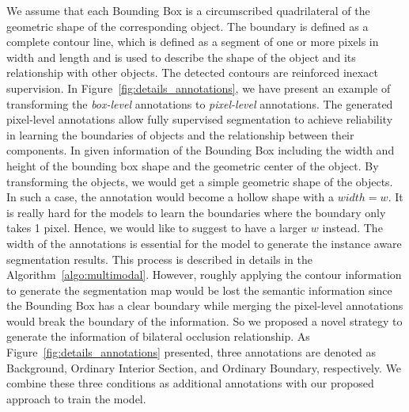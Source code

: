 \documentclass{article}
\begin{document}
{We assume that each Bounding Box is a circumscribed quadrilateral of the geometric shape of the corresponding object.
The boundary is defined as a complete contour line, which is defined as a segment of one or more pixels in width and length and is used to describe the shape of the object and its relationship with other objects. The detected contours are reinforced inexact supervision. In Figure~\ref{fig:details_annotations}, we have present an example of transforming the \textit{box-level} annotations to \textit{pixel-level} annotations.
The generated pixel-level annotations allow fully supervised segmentation to achieve reliability in learning the boundaries of objects and the relationship between their components. In given information of the Bounding Box including the width and height of the bounding box shape and the geometric center of the object. By transforming the objects, we would get a simple geometric shape of the objects. In such a case, the annotation would become a hollow shape with a $width=w$. It is really hard for the models to learn the boundaries where the boundary only takes 1 pixel. Hence, we would like to suggest to have a larger $w$ instead. The width of the annotations is essential for the model to generate the instance aware segmentation results. This process is described in details in the Algorithm~\ref{algo:multimodal}.
However, roughly applying the contour information to generate the segmentation map would be lost the semantic information since the Bounding Box has a clear boundary while merging the pixel-level annotations would break the boundary of the information. So we proposed a novel strategy to generate the information of bilateral occlusion relationship. 
As Figure~\ref{fig:details_annotations} presented, three annotations are denoted as Background, Ordinary Interior Section, and Ordinary Boundary, respectively. We combine these three conditions as additional annotations with our proposed approach to train the model.
}
\end{document}
